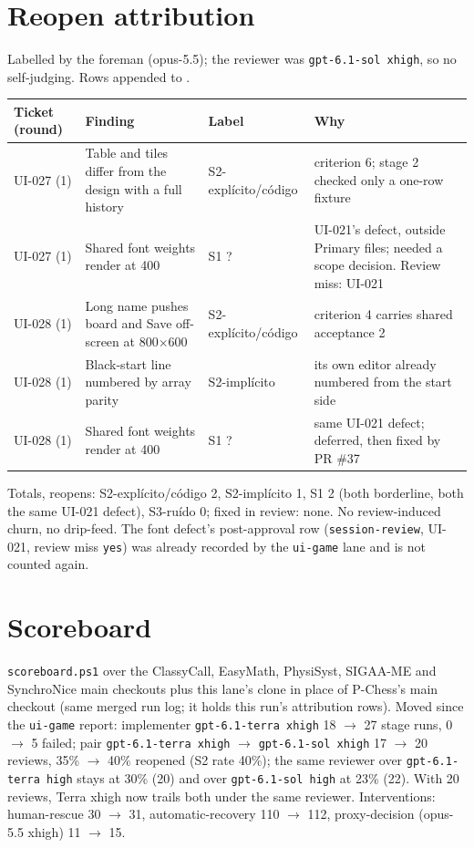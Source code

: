 \documentclass[11pt,a4paper]{article}
\begin{document}
\section*{Reopen attribution}

Labelled by the foreman (opus-5.5); the reviewer was \texttt{gpt-6.1-sol xhigh}, so no
self-judging. Rows appended to .

{\small\noindent
\begin{tabularx}{\linewidth}{@{}>{\raggedright\arraybackslash}p{1.7cm}X>{\raggedright\arraybackslash}p{2.7cm}X@{}}
\toprule
Ticket (round) & Finding & Label & Why \\
\midrule
UI-027 (1) & Table and tiles differ from the design with a full history & S2-explícito/\allowbreak código & criterion 6; stage 2 checked only a one-row fixture \\
UI-027 (1) & Shared font weights render at 400 & S1 ? & UI-021's defect, outside Primary files; needed a scope decision. Review miss: UI-021 \\
UI-028 (1) & Long name pushes board and Save off-screen at 800$\times$600 & S2-explícito/\allowbreak código & criterion 4 carries shared acceptance 2 \\
UI-028 (1) & Black-start line numbered by array parity & S2-implícito & its own editor already numbered from the start side \\
UI-028 (1) & Shared font weights render at 400 & S1 ? & same UI-021 defect; deferred, then fixed by PR \#37 \\
\bottomrule
\end{tabularx}
}

Totals, reopens: S2-explícito/código 2, S2-implícito 1, S1 2 (both borderline, both the same
UI-021 defect), S3-ruído 0; fixed in review: none. No review-induced churn, no drip-feed. The font
defect's post-approval row (\texttt{session-review}, UI-021, review miss \texttt{yes}) was already
recorded by the \texttt{ui-game} lane and is not counted again.

\section*{Scoreboard}

\texttt{scoreboard.ps1} over the ClassyCall, EasyMath, PhysiSyst, SIGAA-ME and SynchroNice main
checkouts plus this lane's clone in place of P-Chess's main checkout (same merged run log; it holds
this run's attribution rows). Moved since the \texttt{ui-game} report: implementer
\texttt{gpt-6.1-terra xhigh} 18 $\to$ 27 stage runs, 0 $\to$ 5 failed; pair
\texttt{gpt-6.1-terra xhigh} $\rightarrow$ \texttt{gpt-6.1-sol xhigh} 17 $\to$ 20 reviews, 35\% $\to$
40\% reopened (S2 rate 40\%); the same reviewer over \texttt{gpt-6.1-terra high} stays at 30\% (20)
and over \texttt{gpt-6.1-sol high} at 23\% (22). With 20 reviews, Terra xhigh now trails both under
the same reviewer. Interventions: human-rescue 30 $\to$ 31, automatic-recovery 110 $\to$ 112,
proxy-decision (opus-5.5 xhigh) 11 $\to$ 15.
\end{document}
